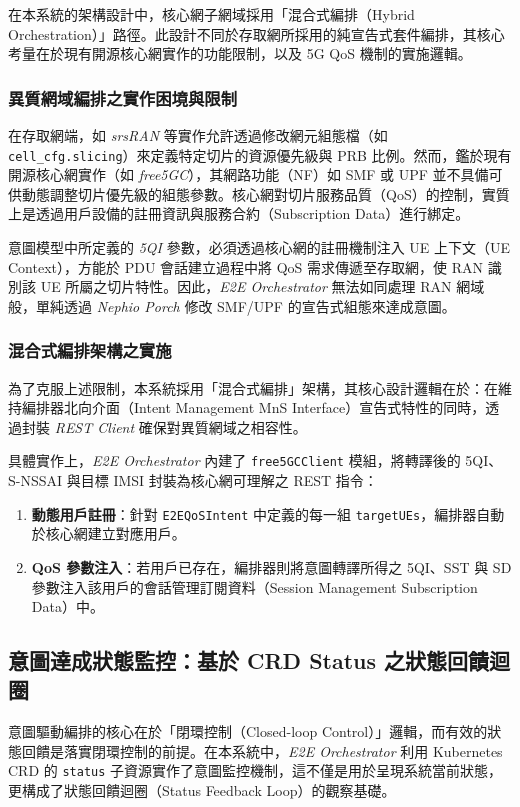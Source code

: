 在本系統的架構設計中，核心網子網域採用「混合式編排（Hybrid Orchestration）」路徑。此設計不同於存取網所採用的純宣告式套件編排，其核心考量在於現有開源核心網實作的功能限制，以及 5G QoS 機制的實施邏輯。

\subsubsection{異質網域編排之實作困境與限制}
在存取網端，如 \textit{srsRAN} 等實作允許透過修改網元組態檔（如 \texttt{cell\_cfg.slicing}）來定義特定切片的資源優先級與 PRB 比例。然而，鑑於現有開源核心網實作（如 \textit{free5GC}），其網路功能（NF）如 SMF 或 UPF 並不具備可供動態調整切片優先級的組態參數。核心網對切片服務品質（QoS）的控制，實質上是透過用戶設備的註冊資訊與服務合約（Subscription Data）進行綁定。

意圖模型中所定義的 \textit{5QI} 參數，必須透過核心網的註冊機制注入 UE 上下文（UE Context），方能於 PDU 會話建立過程中將 QoS 需求傳遞至存取網，使 RAN 識別該 UE 所屬之切片特性。因此，\textit{E2E Orchestrator} 無法如同處理 RAN 網域般，單純透過 \textit{Nephio Porch} 修改 SMF/UPF 的宣告式組態來達成意圖。

\subsubsection{混合式編排架構之實施}
為了克服上述限制，本系統採用「混合式編排」架構，其核心設計邏輯在於：在維持編排器北向介面（Intent Management MnS Interface）宣告式特性的同時，透過封裝 \textit{REST Client} 確保對異質網域之相容性。

具體實作上，\textit{E2E Orchestrator} 內建了 \texttt{free5GCClient} 模組，將轉譯後的 5QI、S-NSSAI 與目標 IMSI 封裝為核心網可理解之 REST 指令：
\begin{enumerate}
    \item \textbf{動態用戶註冊}：針對 \texttt{E2EQoSIntent} 中定義的每一組 \texttt{targetUEs}，編排器自動於核心網建立對應用戶。
    \item \textbf{QoS 參數注入}：若用戶已存在，編排器則將意圖轉譯所得之 5QI、SST 與 SD 參數注入該用戶的會話管理訂閱資料（Session Management Subscription Data）中。
\end{enumerate}

\subsection{意圖達成狀態監控：基於 CRD Status 之狀態回饋迴圈}
\label{subsec:intent_monitoring}

意圖驅動編排的核心在於「閉環控制（Closed-loop Control）」邏輯，而有效的狀態回饋是落實閉環控制的前提。在本系統中，\textit{E2E Orchestrator} 利用 Kubernetes CRD 的 \texttt{status} 子資源實作了意圖監控機制，這不僅是用於呈現系統當前狀態，更構成了狀態回饋迴圈（Status Feedback Loop）的觀察基礎。

